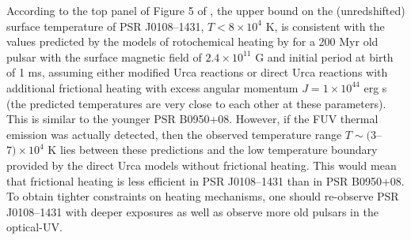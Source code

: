 \documentclass[pdftex,twocolumn]{aastex62}
\newcommand{\yus}[1]{{\color[rgb]{0.5,0.1,0.5}YS: #1}}
\begin{document}

According to the top panel of  Figure 5 of \citet{Guillot2019}, the
upper bound on the (unredshifted) surface temperature of PSR J0108--1431, $T < 8\times 10^4$ K,
is consistent with 
the values predicted by the models of rotochemical heating by \citet{2010GR} for a 200 Myr old pulsar with the surface magnetic field of $2.4\times 10^{11}$ G and initial period at birth of 1 ms, assuming either modified Urca reactions or direct Urca reactions with additional frictional heating with excess angular momentum $J=1\times 10^{44}$ erg s (the predicted temperatures are very close to each other at these parameters). 
This is similar to the younger PSR B0950+08. 
However, if the FUV thermal emission was actually detected, then the observed temperature range $T\sim (3$--$7)\times 10^4$ K 
lies between  these predictions and the low temperature  boundary provided by the direct Urca models 
without frictional heating. This would mean that  frictional heating is less 
efficient in PSR J0108--1431 than in  PSR B0950+08.
To obtain tighter constraints on heating mechanisms, one should re-observe PSR J0108--1431 with deeper exposures as well as observe more old pulsars in the optical-UV.



\end{document}
